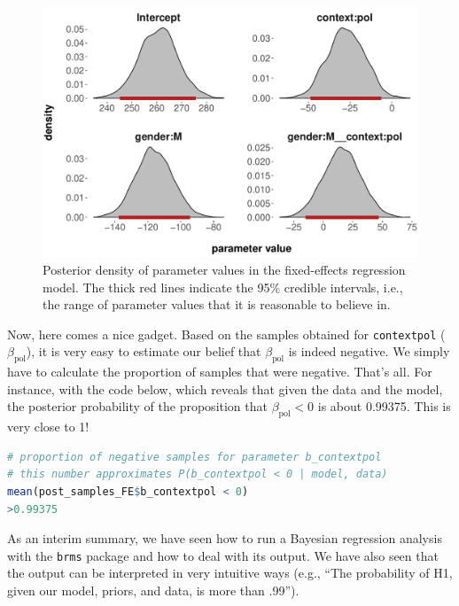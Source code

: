 \documentclass[nobib]{tufte-handout}
\begin{document}
\begin{figure}
  \centering
  \includegraphics[width=\textwidth]{pics/posterior_density_FE.pdf}
  \caption[Posterior over coefficients in fixed-effects model]{Posterior density of parameter
    values in the fixed-effects regression model. The thick red lines indicate the 95\%
    credible intervals, i.e., the range of parameter values that it is reasonable to believe
    in.}
  \label{fig:Posteriors_FE}
\end{figure}

Now, here comes a nice gadget. Based on the samples obtained for \texttt{contextpol} ($\beta_{\text{pol}}$), it is very easy to estimate our belief that $\beta_{\text{pol}}$ is indeed negative. We simply have to calculate the proportion of samples that were negative. That's all. For instance, with the code below, which reveals that given the data and the model, the posterior probability of the proposition that $\beta_{\text{pol}} < 0$ is about 0.99375. This is very close to 1!  

\bigskip

\begin{minipage}[]{\textwidth}
\begin{lstlisting}[language=R]
# proportion of negative samples for parameter b_contextpol
# this number approximates P(b_contextpol < 0 | model, data)
mean(post_samples_FE$b_contextpol < 0) 
>0.99375
\end{lstlisting}
\end{minipage}

As an interim summary, we have seen how to run a Bayesian regression analysis with the
\texttt{brms} package and how to deal with its output. We have also seen that the output can be interpreted in very intuitive ways (e.g., ``The probability of H1, given our model, priors, and data, is more than .99'').
\end{document}
